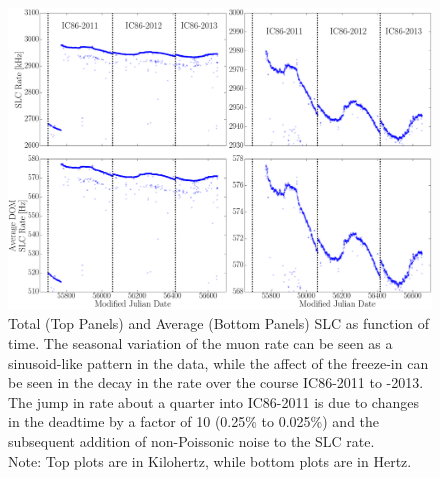 \begin{figure}
  \begin{center}
    \includegraphics[width=1\textwidth]{./figures/AvgSLCRateIC86I_III.png} 
  \end{center}
  \caption{ Total (Top Panels) and Average (Bottom Panels) SLC as function of time. The seasonal variation of the muon rate can be seen as a sinusoid-like pattern in the data, while the affect of the freeze-in can be seen in the decay in the rate over the course IC86-2011 to -2013. The jump in rate about a quarter into IC86-2011 is due to changes in the deadtime by a factor of 10 (0.25\% to 0.025\%) and the subsequent addition of non-Poissonic noise to the SLC rate.\\
  Note: Top plots are in Kilohertz, while bottom plots are in Hertz.\label{fig:SLCrateIC86ItoIII}}   
\end{figure}

